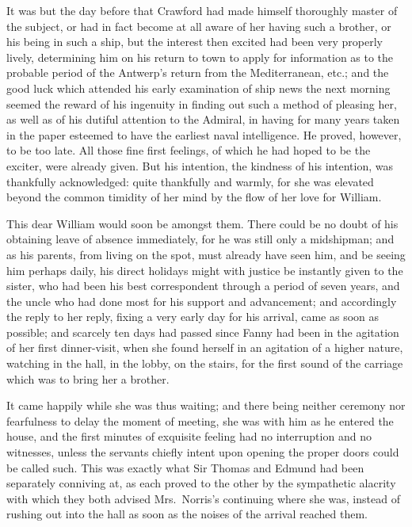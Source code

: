 It was but the day before that Crawford had made himself
thoroughly master of the subject, or had in fact become
at all aware of her having such a brother, or his being
in such a ship, but the interest then excited had been
very properly lively, determining him on his return to
town to apply for information as to the probable period
of the Antwerp's return from the Mediterranean, etc.;
and the good luck which attended his early examination
of ship news the next morning seemed the reward of his
ingenuity in finding out such a method of pleasing her,
as well as of his dutiful attention to the Admiral,
in having for many years taken in the paper esteemed
to have the earliest naval intelligence.  He proved,
however, to be too late.  All those fine first feelings,
of which he had hoped to be the exciter, were already given.
But his intention, the kindness of his intention,
was thankfully acknowledged:  quite thankfully and warmly,
for she was elevated beyond the common timidity of her
mind by the flow of her love for William.

This dear William would soon be amongst them.  There could
be no doubt of his obtaining leave of absence immediately,
for he was still only a midshipman; and as his parents,
from living on the spot, must already have seen him,
and be seeing him perhaps daily, his direct holidays
might with justice be instantly given to the sister,
who had been his best correspondent through a period of
seven years, and the uncle who had done most for his support
and advancement; and accordingly the reply to her reply,
fixing a very early day for his arrival, came as soon
as possible; and scarcely ten days had passed since Fanny
had been in the agitation of her first dinner-visit,
when she found herself in an agitation of a higher nature,
watching in the hall, in the lobby, on the stairs,
for the first sound of the carriage which was to bring her
a brother.

It came happily while she was thus waiting; and there
being neither ceremony nor fearfulness to delay the moment
of meeting, she was with him as he entered the house,
and the first minutes of exquisite feeling had no interruption
and no witnesses, unless the servants chiefly intent
upon opening the proper doors could be called such.
This was exactly what Sir Thomas and Edmund had been
separately conniving at, as each proved to the other
by the sympathetic alacrity with which they both advised
Mrs.\ Norris's continuing where she was, instead of rushing
out into the hall as soon as the noises of the arrival
reached them.

